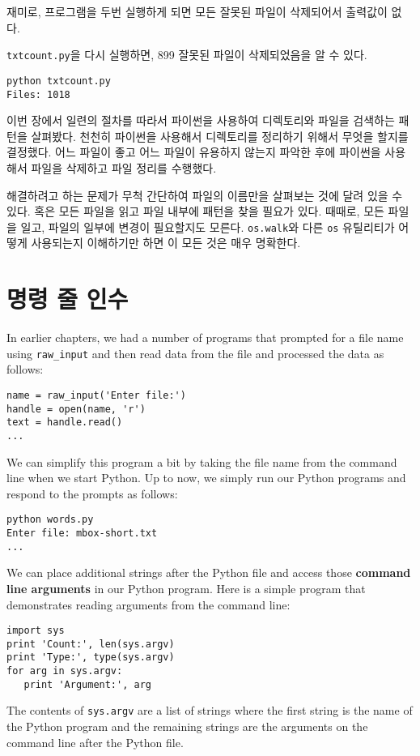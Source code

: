 재미로, 프로그램을 두번 실행하게 되면 모든 잘못된 파일이 삭제되어서 출력값이 없다.

{\tt txtcount.py}을 다시 실행하면, 899 잘못된 파일이 삭제되었음을 알 수 있다.

\beforeverb
\begin{verbatim}
python txtcount.py 
Files: 1018
\end{verbatim}
\afterverb
%

이번 장에서 일련의 절차를 따라서 파이썬을 사용하여 디렉토리와 파일을 검색하는 패턴을 살펴봤다.
천천히 파이썬을 사용해서 디렉토리를 정리하기 위해서 무엇을 할지를 결정했다.
어느 파일이 좋고 어느 파일이 유용하지 않는지 파악한 후에 파이썬을 사용해서 파일을 삭제하고 
파일 정리를 수행했다.

해결하려고 하는 문제가 무척 간단하여 파일의 이름만을 살펴보는 것에 달려 있을 수 있다. 
혹은 모든 파일을 읽고 파일 내부에 패턴을 찾을 필요가 있다.
때때로, 모든 파일을 일고, 파일의 일부에 변경이 필요할지도 모른다. 
{\tt os.walk}와 다른 {\tt os} 유틸리티가 어떻게 사용되는지 이해하기만 하면 이 모든 것은 매우 명확한다.


\section{명령 줄 인수}


In earlier chapters, we had a number of programs that prompted
for a file name using \verb"raw_input" and then read data 
from the file and processed the data as follows:

\beforeverb
\begin{verbatim}
name = raw_input('Enter file:')
handle = open(name, 'r')
text = handle.read()
...
\end{verbatim}
\afterverb
%
We can simplify this program a bit by taking the file name
from the command line when we start Python.  Up to now,
we simply run our Python programs and respond to the 
prompts as follows:

\beforeverb
\begin{verbatim}
python words.py
Enter file: mbox-short.txt
...
\end{verbatim}
\afterverb
%
We can place additional strings after the Python file and access
those {\bf command line arguments} in our Python program.  Here is a simple program 
that demonstrates reading arguments from the command line:

\beforeverb
\begin{verbatim}
import sys
print 'Count:', len(sys.argv)
print 'Type:', type(sys.argv)
for arg in sys.argv:
   print 'Argument:', arg
\end{verbatim}
\afterverb
%
The contents of {\tt sys.argv} are a list of strings where the first string
is the name of the Python program and the remaining strings are the arguments
on the command line after the Python file.

